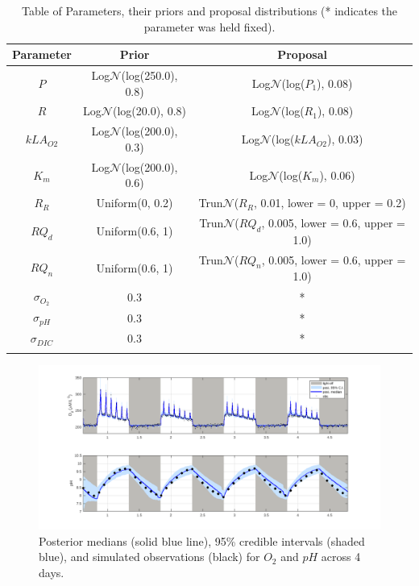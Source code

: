 \documentclass{ruthesis}
\begin{document}
\begin{longtable}{| c | c  |  c |}
	\hline
	\bfseries{Parameter} & \bfseries{Prior} &  \bfseries{Proposal} \\ \hline
	$P$  		& Log$\mathcal{N}$(log(250.0), 0.8)  & Log$\mathcal{N}$(log($P_1$), 0.08)   \\
	$R$  		& Log$\mathcal{N}$(log(20.0), 0.8)   & Log$\mathcal{N}$(log($R_1$), 0.08)   \\
	$kLA_{O2}$  & Log$\mathcal{N}$(log(200.0), 0.3)  & Log$\mathcal{N}$(log($kLA_{O2}$), 0.03) \\
	$K_m$ 		&  Log$\mathcal{N}$(log(200.0), 0.6) & Log$\mathcal{N}$(log($K_m$), 0.06) \\
	$R_R$  		& Uniform(0, 0.2) &  Trun$\mathcal{N}$($R_R$, 0.01, lower = 0, upper = 0.2) \\
	$RQ_d$  	& Uniform(0.6, 1) &  Trun$\mathcal{N}$($RQ_d$, 0.005, lower = 0.6, upper = 1.0)\\
	$RQ_n$  	& Uniform(0.6, 1) &  Trun$\mathcal{N}$($RQ_n$, 0.005, lower = 0.6, upper = 1.0)\\
	$\sigma_{O_2}$ 	& 0.3 	& * \\
	$\sigma_{pH}$ 	& 0.3 	& * \\
	$\sigma_{DIC}$ 	& 0.3 	& * \\	
	\hline
	\caption[.]{Table of Parameters, their priors and proposal distributions (* indicates the parameter was held fixed).}
	\label{tab:micro_sim_priors}
\end{longtable}
 

\begin{figure}
	\centerline{\includegraphics[width=1.2\textwidth]{images_microalgae/posterior_plots_with_fake_data/O2_pH}}
	\caption[.]{Posterior medians (solid blue line), 95\% credible intervals (shaded blue), and simulated observations (black) for $O_2$ and $pH$ across 4 days.}
	\label{fig:pos_sim_O2_pH}
\end{figure}
\end{document}
